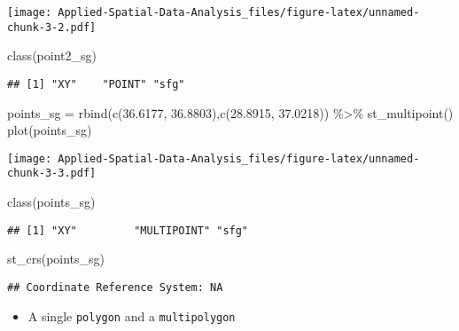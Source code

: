 \documentclass[
]{book}
\newenvironment{Shaded}{\begin{snugshade}}{\end{snugshade}}
\newcommand{\FloatTok}[1]{\textcolor[rgb]{0.00,0.00,0.81}{#1}}
\newcommand{\FunctionTok}[1]{\textcolor[rgb]{0.00,0.00,0.00}{#1}}
\newcommand{\NormalTok}[1]{#1}
\newcommand{\OtherTok}[1]{\textcolor[rgb]{0.56,0.35,0.01}{#1}}
\newcommand{\SpecialCharTok}[1]{\textcolor[rgb]{0.00,0.00,0.00}{#1}}
\providecommand{\tightlist}{%
  \setlength{\itemsep}{0pt}\setlength{\parskip}{0pt}}
\begin{document}
\texttt{[image: Applied-Spatial-Data-Analysis\_files/figure-latex/unnamed-chunk-3-2.pdf]}

\begin{Shaded}
\begin{Highlighting}[]
\FunctionTok{class}\NormalTok{(point2\_sg)}
\end{Highlighting}
\end{Shaded}

\begin{verbatim}
## [1] "XY"    "POINT" "sfg"
\end{verbatim}

\begin{Shaded}
\begin{Highlighting}[]
\NormalTok{points\_sg }\OtherTok{=} \FunctionTok{rbind}\NormalTok{(}\FunctionTok{c}\NormalTok{(}\FloatTok{36.6177}\NormalTok{, }\FloatTok{36.8803}\NormalTok{),}\FunctionTok{c}\NormalTok{(}\FloatTok{28.8915}\NormalTok{, }\FloatTok{37.0218}\NormalTok{)) }\SpecialCharTok{\%\textgreater{}\%} \FunctionTok{st\_multipoint}\NormalTok{()}
\FunctionTok{plot}\NormalTok{(points\_sg)}
\end{Highlighting}
\end{Shaded}

\texttt{[image: Applied-Spatial-Data-Analysis\_files/figure-latex/unnamed-chunk-3-3.pdf]}

\begin{Shaded}
\begin{Highlighting}[]
\FunctionTok{class}\NormalTok{(points\_sg)}
\end{Highlighting}
\end{Shaded}

\begin{verbatim}
## [1] "XY"         "MULTIPOINT" "sfg"
\end{verbatim}

\begin{Shaded}
\begin{Highlighting}[]
\FunctionTok{st\_crs}\NormalTok{(points\_sg)}
\end{Highlighting}
\end{Shaded}

\begin{verbatim}
## Coordinate Reference System: NA
\end{verbatim}

\begin{itemize}
\tightlist
\item
  A single \texttt{polygon} and a \texttt{multipolygon}
\end{itemize}
\end{document}
